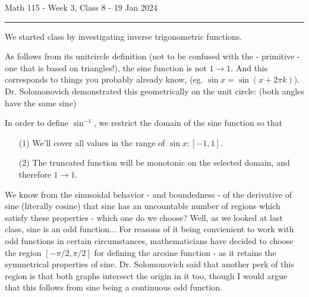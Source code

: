 \documentclass{article}
\begin{document}
Math 115 - Week 3, Class 8 - 19 Jan 2024
\hrule

\vspace{10pt}

We started class by investigating inverse trigonometric functions.

\vspace{10pt}

As follows from its unitcircle definition (not to be confused with the - primitive - one that is based on triangles!), the sine function is not $1\to1$. And this corresponds to things you probably already know, (eg. $\sin x=\sin(x+2\pi k)$). Dr. Solomonovich demonstrated this geometrically on the unit circle: (both angles have the same sine)

\begin{center}
\end{center}

In order to define $\sin^{-1}$, we restrict the domain of the sine function so that

\begin{enumerate}
\item[(1)] We'll cover all values in the range of $\sin x:[-1,1]$.
\item[(2)] The truncated function will be monotonic on the selected domain, and therefore $1\to1$.
\end{enumerate}

We know from the sinusoidal behavior - and boundedness - of the derivative of sine (literally cosine) that sine has an uncountable number of regions which satisfy these properties - which one do we choose? Well, as we looked at last class, sine is an odd function... For reasons of it being convienient to work with odd functions in certain circumstances, mathematicians have decided to choose the region $[-\pi/2,\pi/2]$ for defining the arcsine function - as it retains the symmetrical properties of sine. Dr. Solomonovich said that another perk of this region is that both graphs intersect the origin in it too, though I would argue that this follows from sine being a continuous odd function.
\end{document}
